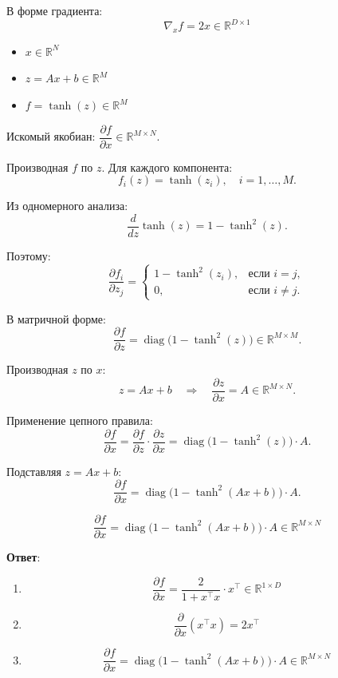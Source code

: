 \documentclass[pract]{SCWorks}
\begin{document}
    В форме градиента:
    \[
    \boxed{\nabla_x f = 2x \in \mathbb{R}^{D \times 1}}
    \]

    \begin{itemize}
        \item[$\bullet$] $x \in \mathbb{R}^N$
        \item[$\bullet$] $z = Ax + b \in \mathbb{R}^M$
        \item[$\bullet$] $f = \tanh(z) \in \mathbb{R}^M$
    \end{itemize}

    Искомый якобиан: $\dfrac{\partial f}{\partial x} \in \mathbb{R}^{M \times N}$.

    Производная $f$ по $z$. Для каждого компонента:
    \[
    f_i(z) = \tanh(z_i), \quad i = 1, \dots, M.
    \]

    Из одномерного анализа:
    \[
    \frac{d}{dz} \tanh(z) = 1 - \tanh^2(z).
    \]

    Поэтому:
    \[
    \frac{\partial f_i}{\partial z_j} =
    \begin{cases}
    1 - \tanh^2(z_i), & \text{если } i = j, \\
    0, & \text{если } i \neq j.
    \end{cases}
    \]

    В матричной форме:
    \[
    \frac{\partial f}{\partial z} = \operatorname{diag}\bigl(1 - \tanh^2(z)\bigr) \in \mathbb{R}^{M \times M}.
    \]

    Производная $z$ по $x$:
    \[
    z = Ax + b \quad \Rightarrow \quad \frac{\partial z}{\partial x} = A \in \mathbb{R}^{M \times N}.
    \]

    Применение цепного правила:
    \[
    \frac{\partial f}{\partial x} = \frac{\partial f}{\partial z} \cdot \frac{\partial z}{\partial x}
    = \operatorname{diag}\bigl(1 - \tanh^2(z)\bigr) \cdot A.
    \]

    Подставляя $z = Ax + b$:
    \[
    \frac{\partial f}{\partial x} = \operatorname{diag}\bigl(1 - \tanh^2(Ax + b)\bigr) \cdot A.
    \]

    \[
    \boxed{\frac{\partial f}{\partial x} = \operatorname{diag}\bigl(1 - \tanh^2(Ax + b)\bigr) \cdot A \in \mathbb{R}^{M \times N}}
    \]

    \textbf{Ответ}:
    \begin{enumerate}[label=\alph*)]
        \item
        \[
        \boxed{\frac{\partial f}{\partial x} = \frac{2}{1 + x^\top x} \cdot x^\top \in \mathbb{R}^{1 \times D}}
        \]
        \item
        \[
            \boxed{
        \frac{\partial}{\partial x} (x^\top x) = 2x^\top
            }
        \]
        \item
        \[
        \boxed{\frac{\partial f}{\partial x} = \operatorname{diag}\bigl(1 - \tanh^2(Ax + b)\bigr) \cdot A \in \mathbb{R}^{M \times N}}
        \]
    \end{enumerate}
\end{document}
